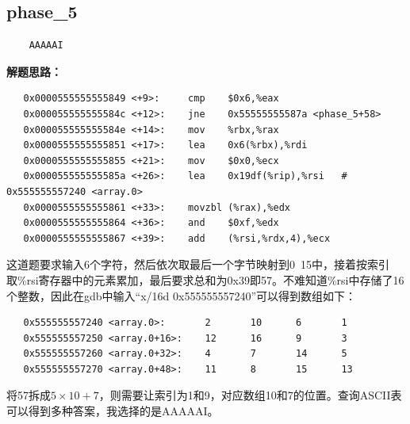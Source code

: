 \documentclass{article}
\begin{document}
\subsection{phase\_5}
\begin{verbatim}
    AAAAAI
\end{verbatim}
\textbf{解题思路：}
\begin{verbatim}
   0x0000555555555849 <+9>:     cmp    $0x6,%eax
   0x000055555555584c <+12>:    jne    0x55555555587a <phase_5+58>
   0x000055555555584e <+14>:    mov    %rbx,%rax
   0x0000555555555851 <+17>:    lea    0x6(%rbx),%rdi
   0x0000555555555855 <+21>:    mov    $0x0,%ecx
   0x000055555555585a <+26>:    lea    0x19df(%rip),%rsi   # 0x555555557240 <array.0>
   0x0000555555555861 <+33>:    movzbl (%rax),%edx
   0x0000555555555864 <+36>:    and    $0xf,%edx
   0x0000555555555867 <+39>:    add    (%rsi,%rdx,4),%ecx
\end{verbatim}
这道题要求输入6个字符，然后依次取最后一个字节映射到0~15中，接着按索引取\%rsi寄存器中的元素累加，最后要求总和为0x39即57。不难知道\%rsi中存储了16个整数，因此在gdb中输入“x/16d 0x555555557240”可以得到数组如下：
\begin{verbatim}
   0x555555557240 <array.0>:       2       10      6       1
   0x555555557250 <array.0+16>:    12      16      9       3
   0x555555557260 <array.0+32>:    4       7       14      5
   0x555555557270 <array.0+48>:    11      8       15      13
\end{verbatim}
将57拆成$5\times10+7$，则需要让索引为1和9，对应数组10和7的位置。查询ASCII表可以得到多种答案，我选择的是AAAAAI。
\end{document}
